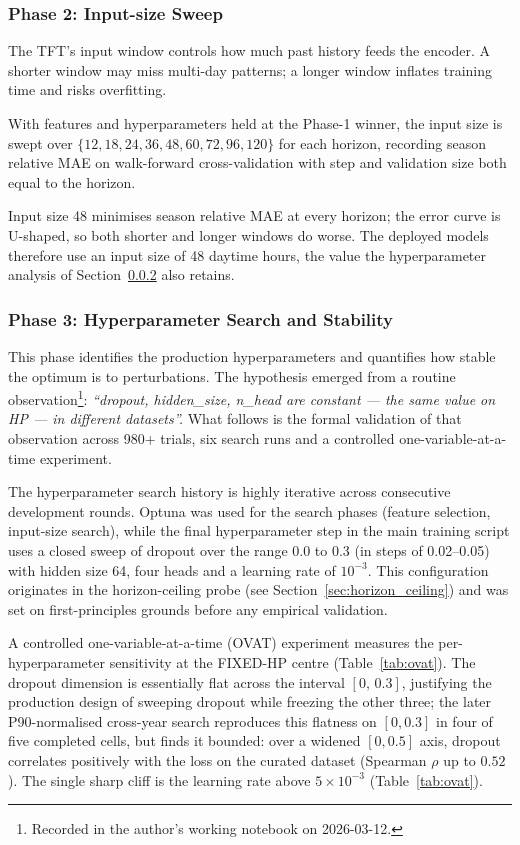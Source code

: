\documentclass[twocolumn,twoside,a4paper,10pt]{IEEEtran}
\begin{document}
\subsubsection{Phase 2: Input-size Sweep}\label{sec:phase2}

The TFT's input window controls how much past history feeds the encoder. A shorter window may miss multi-day patterns; a longer window inflates training time and risks overfitting.

With features and hyperparameters held at the Phase-1 winner, the input size is swept over $\{12, 18, 24, 36, 48, 60, 72, 96, 120\}$ for each horizon, recording season relative MAE on walk-forward cross-validation with step and validation size both equal to the horizon.

Input size 48 minimises season relative MAE at every horizon; the error curve is U-shaped, so both shorter and longer windows do worse. The deployed models therefore use an input size of 48 daytime hours, the value the hyperparameter analysis of Section~\ref{sec:p3} also retains.

\subsubsection{Phase 3: Hyperparameter Search and Stability}\label{sec:p3}

This phase identifies the production hyperparameters and quantifies how stable
the optimum is to perturbations. The hypothesis emerged from a routine
observation\footnote{Recorded in the author's working notebook on 2026-03-12.}:
\emph{``dropout, hidden\_size, n\_head are constant --- the same value on HP
--- in different datasets''.} What follows is the formal validation of that
observation across 980+ trials, six search runs and a controlled
one-variable-at-a-time experiment.

The hyperparameter search history is highly iterative across consecutive development rounds. Optuna was used for the search phases (feature selection, input-size search), while the final hyperparameter step in the main training script uses a closed sweep of dropout over the range 0.0 to 0.3 (in steps of 0.02--0.05) with hidden size 64, four heads and a learning rate of $10^{-3}$. This configuration originates in the horizon-ceiling probe (see Section~\ref{sec:horizon_ceiling}) and was set on first-principles grounds before any empirical validation.

A controlled one-variable-at-a-time (OVAT) experiment measures the per-hyperparameter sensitivity at the FIXED-HP centre (Table~\ref{tab:ovat}). The dropout dimension is essentially flat across the interval $[0,\,0.3]$, justifying the production design of sweeping dropout while freezing the other three; the later P90-normalised cross-year search reproduces this flatness on $[0,0.3]$ in four of five completed cells, but finds it bounded: over a widened $[0,0.5]$ axis, dropout correlates positively with the loss on the curated dataset (Spearman $\rho$ up to $0.52$). The single sharp cliff is the learning rate above $5\!\times\!10^{-3}$ (Table~\ref{tab:ovat}).
\end{document}

